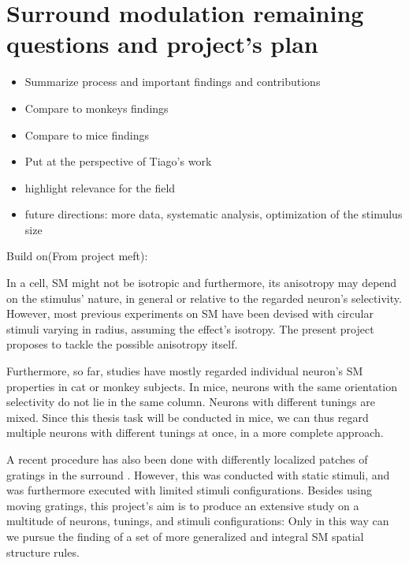 \label{cap:conclusions}


\section{Surround modulation remaining questions and project's plan} \label{Plan}

\begin{itemize}
\item Summarize process and important findings and contributions
\item Compare to monkeys findings
\item Compare to mice findings
\item Put at the perspective of Tiago's work
\item highlight relevance for the field
\item future directions: more data, systematic analysis, optimization of the stimulus size
\end{itemize}


Build on(From project meft):

In a cell, SM might not be isotropic and furthermore, its anisotropy may depend on the stimulus' nature, in general or relative to the regarded neuron's selectivity. However, most previous experiments on SM have been devised with circular stimuli varying in radius, assuming the effect's isotropy. The present project proposes to tackle the possible anisotropy itself.

Furthermore, so far, studies have mostly regarded individual neuron's SM properties in cat or monkey subjects. In mice, neurons with the same orientation selectivity do not lie in the same column. Neurons with different tunings are mixed. Since this thesis task will be conducted in mice, we can thus regard multiple neurons with different tunings at once, in a more complete approach.

A recent procedure has also been done with differently localized patches of gratings in the surround \cite{SManisotropy}. However, this was conducted with static stimuli, and was furthermore executed with limited stimuli configurations. Besides using moving gratings, this project's aim is to produce an extensive study on a multitude of neurons, tunings, and stimuli configurations: Only in this way can we pursue the finding of a set of more generalized and integral SM spatial structure rules.

